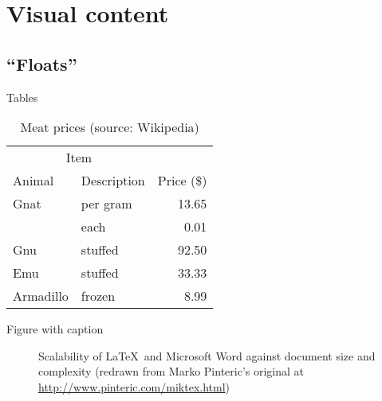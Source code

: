 \documentclass[aspectratio=169%
]{beamer}
\begin{document}
\section{Visual content}
\label{sec:content}

\subsection{\enquote{Floats}}

\begin{frame}{Tables}
  \centering{}
  \begin{table}
    \centering{}
    \caption{Meat prices (source: Wikipedia)}
    \begin{tabular}{llr}
      \toprule
      \multicolumn{2}{c}{Item} &                          \\
      \cmidrule{1-2}
      Animal                   & Description & Price (\$) \\
      \midrule
      Gnat                     & per gram    & 13.65      \\
                               & each        & 0.01       \\
      Gnu                      & stuffed     & 92.50      \\
      Emu                      & stuffed     & 33.33      \\
      Armadillo                & frozen      & 8.99       \\
      \bottomrule
    \end{tabular}
  \end{table}
\end{frame}

\begin{frame}{Figure with caption}
  \centering{}
  \begin{figure}
    \centering
    \caption{Scalability of \LaTeX\ and Microsoft Word\textsuperscript{\textregistered} against document size and complexity (redrawn from Marko Pinteric's original at \url{http://www.pinteric.com/miktex.html})}
  \end{figure}
\end{frame}
\end{document}
